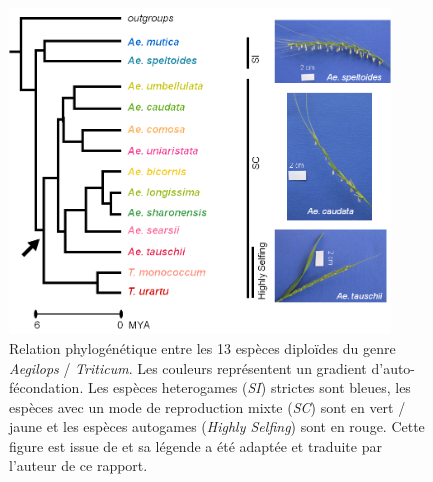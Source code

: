 \documentclass[../main]{subfiles} %
\begin{document}
\addto\extrasfrench{\protected\edef:{\unexpanded\expandafter{:}}}

\begin{figure}[ht]
    \centering
    \includegraphics[width=0.9\textwidth]{../Illustrations/phylogenetic-relationships-modified.png}
    \caption{Relation phylogénétique entre les 13 espèces diploïdes du genre \textit{Aegilops} / \textit{Triticum}. Les couleurs représentent un gradient d'auto-fécondation. Les espèces \glspl{heterogame} (\textit{SI}) strictes sont bleues, les espèces avec un mode de reproduction mixte (\textit{SC}) sont en vert / jaune et les espèces \glspl{autogame} (\textit{Highly Selfing}) sont en rouge. Cette figure est issue de \cite{burgarella_mating_2024} et sa légende a été adaptée et traduite par l'auteur de ce rapport.}
    \label{fig:Phylo}
\end{figure}


\end{document}
